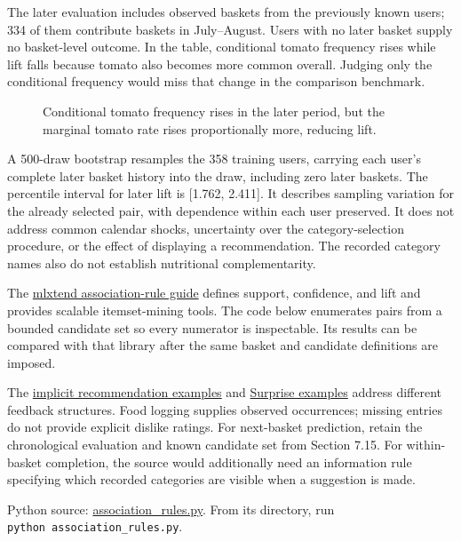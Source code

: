 The later evaluation includes observed baskets from the previously known
users; 334 of them contribute baskets in July--August. Users with no
later basket supply no basket-level outcome. In the table, conditional
tomato frequency rises while lift falls because tomato also becomes more
common overall. Judging only the conditional frequency would miss that
change in the comparison benchmark.

\begin{figure}[htbp]
\centering

\caption{Conditional tomato frequency rises in the later period, but the marginal tomato rate rises proportionally more, reducing lift.}\label{fig:M07_basket_lift}
\end{figure}

A 500-draw bootstrap resamples the 358 training users, carrying each
user's complete later basket history into the draw, including zero later
baskets. The percentile interval for later lift is {[}1.762, 2.411{]}.
It describes sampling variation for the already selected pair, with
dependence within each user preserved. It does not address common
calendar shocks, uncertainty over the category-selection procedure, or
the effect of displaying a recommendation. The recorded category names
also do not establish nutritional complementarity.

The
\href{https://rasbt.github.io/mlxtend/user_guide/frequent_patterns/association_rules/}{mlxtend
association-rule guide} defines support, confidence, and lift and
provides scalable itemset-mining tools. The code below enumerates pairs
from a bounded candidate set so every numerator is inspectable. Its
results can be compared with that library after the same basket and
candidate definitions are imposed.

The
\href{https://github.com/benfred/implicit/tree/main/examples}{implicit
recommendation examples} and
\href{https://github.com/NicolasHug/Surprise/tree/master/examples}{Surprise
examples} address different feedback structures. Food logging supplies
observed occurrences; missing entries do not provide explicit dislike
ratings. For next-basket prediction, retain the chronological evaluation
and known candidate set from Section 7.15. For within-basket completion,
the source would additionally need an information rule specifying which
recorded categories are visible when a suggestion is made.

\FloatBarrier
{}
Python source:
\href{../03_Data_and_Code/mHealth/recurring_examples/association_rules.py}{association\_rules.py}.
From its directory, run \texttt{python\ association\_rules.py}.

